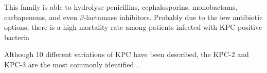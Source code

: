\documentclass[11pt]{report}
\begin{document}
This family is able to hydrolyse penicillins, cephalosporins, monobactams, carbapenems, and even $\beta$-lactamase inhibitors. Probably due to the few antibiotic options, there is a high mortality rate among patients infected with KPC positive bacteria \cite{MunozPrice2013}
                   
Although 10 different variations of KPC have been described, the KPC-2 and KPC-3 are the most commonly identified \cite{WaltherRasmussen2007}.























\end{document}
